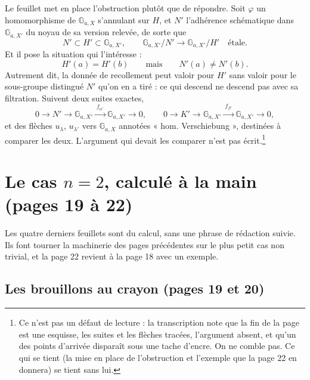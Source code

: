 \documentclass[11pt,a4paper]{article}
\begin{document}
Le feuillet met en place l'obstruction plutôt que de répondre. Soit
$\varphi$ un homomorphisme de $\mathbb{G}_{a,X}$ s'annulant sur $H$, et $N'$
l'adhérence schématique dans $\mathbb{G}_{a,X'}$ du noyau de sa version
relevée, de sorte que
\[
  N' \subset H' \subset \mathbb{G}_{a,X'} , \qquad
  \mathbb{G}_{a,X'}/N' \longrightarrow \mathbb{G}_{a,X'}/H'
  \quad \text{étale} .
\]
Et il pose la situation qui l'intéresse :
\[
  H'(a) = H'(b) \qquad\text{mais}\qquad N'(a) \neq N'(b) .
\]
Autrement dit, la donnée de recollement peut valoir pour $H'$ sans valoir
pour le sous-groupe distingué $N'$ qu'on en a tiré : ce qui descend ne
descend pas avec sa filtration. Suivent deux suites exactes,
\[
  0 \to N' \to \mathbb{G}_{a,X'} \xrightarrow{\ f_{\alpha'}\ }
  \mathbb{G}_{a,X'} \to 0 , \qquad
  0 \to K' \to \mathbb{G}_{a,X'} \xrightarrow{\ f_{\beta'}\ }
  \mathbb{G}_{a,X'} \to 0 ,
\]
et des flèches $u_\lambda$, $u_{\lambda'}$ vers $\mathbb{G}_{a,X}$ annotées
« hom. Verschiebung », destinées à comparer les deux. L'argument qui devait
les comparer n'est pas écrit.\footnote{Ce n'est pas un défaut de lecture : la
transcription note que la fin de la page est une esquisse, les suites et les
flèches tracées, l'argument absent, et qu'un des points d'arrivée disparaît
sous une tache d'encre. On ne comble pas. Ce qui se tient (la mise en place
de l'obstruction et l'exemple que la page 22 en donnera) se tient sans lui.}

\section*{Le cas $n = 2$, calculé à la main (pages 19 à 22)}

Les quatre derniers feuillets sont du calcul, sans une phrase de rédaction
suivie. Ils font tourner la machinerie des pages précédentes
sur le plus petit cas non trivial, et la page 22 revient à la
page 18 avec un exemple.

\subsection*{Les brouillons au crayon (pages 19 et 20)}
\end{document}
